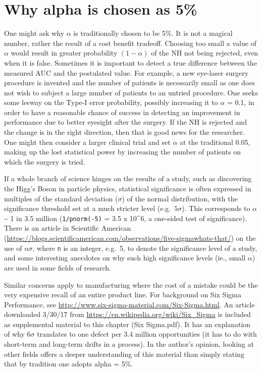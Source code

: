 \documentclass[
]{book}
\begin{document}
\hypertarget{why-alpha-is-chosen-as-5}{%
\section{Why alpha is chosen as 5\%}\label{why-alpha-is-chosen-as-5}}

One might ask why \(\alpha\) is traditionally chosen to be 5\%. It is not a magical number, rather the result of a cost benefit tradeoff. Choosing too small a value of \(\alpha\) would result in greater probability \((1-\alpha)\) of the NH not being rejected, even when it is false. Sometimes it is important to detect a true difference between the measured AUC and the postulated value. For example, a new eye-laser surgery procedure is invented and the number of patients is necessarily small as one does not wish to subject a large number of patients to an untried procedure. One seeks some leeway on the Type-I error probability, possibly increasing it to \(\alpha\) = 0.1, in order to have a reasonable chance of success in detecting an improvement in performance due to better eyesight after the surgery. If the NH is rejected and the change is in the right direction, then that is good news for the researcher. One might then consider a larger clinical trial and set \(\alpha\) at the traditional 0.05, making up the lost statistical power by increasing the number of patients on which the surgery is tried.

If a whole branch of science hinges on the results of a study, such as discovering the Higg's Boson in particle physics, statistical significance is often expressed in multiples of the standard deviation (\(\sigma\)) of the normal distribution, with the significance threshold set at a much stricter level (e.g.~\(5\sigma\)). This corresponds to \(\alpha\) \textasciitilde{} 1 in 3.5 million (\texttt{1/pnorm(-5)} = 3.5 x 10\^{}6, a one-sided test of significance). There is an article in Scientific American (\url{https://blogs.scientificamerican.com/observations/five-sigmawhats-that/}) on the use of \(n\sigma\), where \texttt{n} is an integer, e.g.~5, to denote the significance level of a study, and some interesting anecdotes on why such high significance levels (ie., small \(\alpha\)) are used in some fields of research.

Similar concerns apply to manufacturing where the cost of a mistake could be the very expensive recall of an entire product line. For background on Six Sigma Performance, see \url{http://www.six-sigma-material.com/Six-Sigma.html}. An article downloaded 3/30/17 from \url{https://en.wikipedia.org/wiki/Six_Sigma} is included as supplemental material to this chapter (Six Sigma.pdf). It has an explanation of why \(6\sigma\) translates to one defect per 3.4 million opportunities (it has to do with short-term and long-term drifts in a process). In the author's opinion, looking at other fields offers a deeper understanding of this material than simply stating that by tradition one adopts alpha = 5\%.
\end{document}
